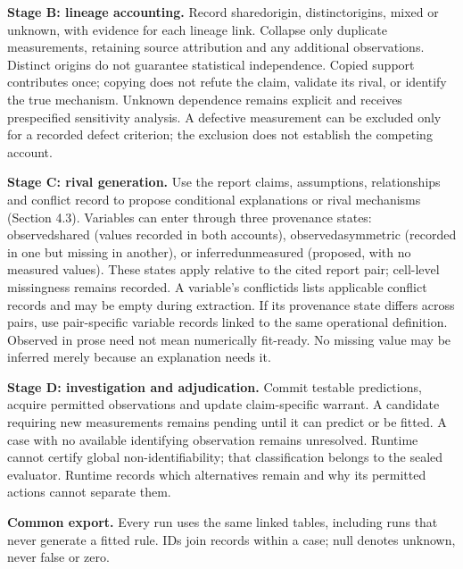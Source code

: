 \documentclass[11pt,a4paper]{article}
\newcommand{\CNSIdentifier}[1]{{\small\ttfamily\def\_{\textunderscore\allowbreak}#1}}
\begin{document}
\textbf{Stage B: lineage accounting.} Record \CNSIdentifier{shared\_origin},
\CNSIdentifier{distinct\_origins}, \CNSIdentifier{mixed} or \CNSIdentifier{unknown}, with
evidence for each lineage link. Collapse only duplicate measurements,
retaining source attribution and any additional observations. Distinct
origins do not guarantee statistical independence. Copied support
contributes once; copying does not refute the claim, validate its rival,
or identify the true mechanism. Unknown dependence remains explicit and
receives prespecified sensitivity analysis. A defective measurement can
be excluded only for a recorded defect criterion; the exclusion does not
establish the competing account.

\textbf{Stage C: rival generation.} Use the report claims, assumptions,
relationships and conflict record to propose conditional explanations or
rival mechanisms (Section 4.3). Variables can enter through three
provenance states: \CNSIdentifier{observed\_shared} (values recorded in both
accounts), \CNSIdentifier{observed\_asymmetric} (recorded in one but missing in
another), or \CNSIdentifier{inferred\_unmeasured} (proposed, with no measured
values). These states apply relative to the cited report pair;
cell-level missingness remains recorded. A variable's
\CNSIdentifier{conflict\_ids} lists applicable conflict records and may be
empty during extraction. If its provenance state differs across pairs,
use pair-specific variable records linked to the same operational
definition. Observed in prose need not mean numerically fit-ready. No
missing value may be inferred merely because an explanation needs it.

\textbf{Stage D: investigation and adjudication.} Commit testable
predictions, acquire permitted observations and update claim-specific
warrant. A candidate requiring new measurements remains pending until it
can predict or be fitted. A case with no available identifying
observation remains unresolved. Runtime cannot certify global
non-identifiability; that classification belongs to the sealed
evaluator. Runtime records which alternatives remain and why its
permitted actions cannot separate them.

\textbf{Common export.} Every run uses the same linked tables, including
runs that never generate a fitted rule. IDs join records within a case;
null denotes unknown, never false or zero.
\end{document}
